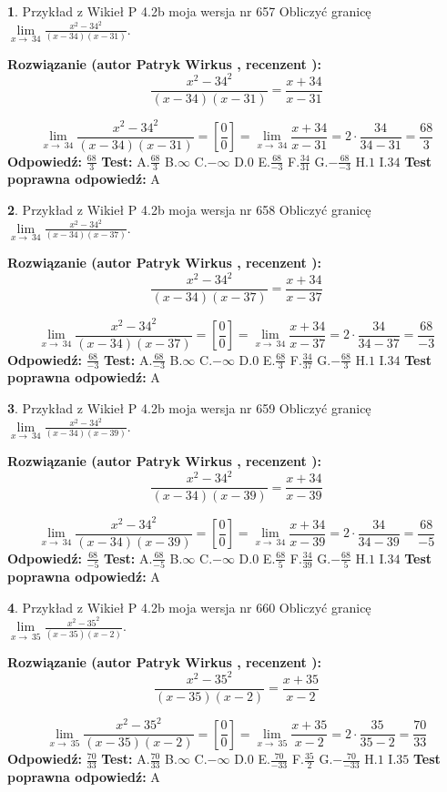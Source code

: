 \documentclass[12pt, a4paper]{article}
\theoremstyle{definition} %
\newtheorem{zad}{}
\newcommand{\zadStart}[1]{\begin{zad}#1\newline}
\newcommand{\zadStop}{\end{zad}}
\newcommand{\rozwStart}[2]{\noindent \textbf{Rozwiązanie (autor #1 , recenzent #2): }\newline}
\newcommand{\rozwStop}{\newline}
\newcommand{\odpStart}{\noindent \textbf{Odpowiedź:}\newline}
\newcommand{\odpStop}{\newline}
\newcommand{\testStart}{\noindent \textbf{Test:}\newline}
\newcommand{\testStop}{\newline}
\newcommand{\kluczStart}{\noindent \textbf{Test poprawna odpowiedź:}\newline}
\newcommand{\kluczStop}{\newline}
\begin{document}
\zadStart{Przykład z Wikieł P 4.2b moja wersja nr 657}
Obliczyć granicę $\lim\limits_{x\to\ 34}\frac{x^{2}-34^{2}}{(x-34)(x-31)}$.
\zadStop
\rozwStart{Patryk Wirkus}{}
$$\frac{x^{2}-34^{2}}{(x-34)(x-31)}=\frac{x+34}{x-31}$$

$$\lim\limits_{x\to\ 34}\frac{x^{2}-34^{2}}{(x-34)(x-31)}=[\frac{0}{0}]=\lim\limits_{x\to\ 34}\frac{x+34}{x-31}=2 \cdot \frac{34}{34-31} = \frac{68}{3}$$
\rozwStop
\odpStart
$\frac{68}{3}$
\odpStop
\testStart
A.$\frac{68}{3}$
B.$\infty$
C.$-\infty$
D.$0$
E.$\frac{68}{-3}$
F.$\frac{34}{31}$
G.$-\frac{68}{-3}$
H.$1$
I.$34$
\testStop
\kluczStart
A
\kluczStop



\zadStart{Przykład z Wikieł P 4.2b moja wersja nr 658}
Obliczyć granicę $\lim\limits_{x\to\ 34}\frac{x^{2}-34^{2}}{(x-34)(x-37)}$.
\zadStop
\rozwStart{Patryk Wirkus}{}
$$\frac{x^{2}-34^{2}}{(x-34)(x-37)}=\frac{x+34}{x-37}$$

$$\lim\limits_{x\to\ 34}\frac{x^{2}-34^{2}}{(x-34)(x-37)}=[\frac{0}{0}]=\lim\limits_{x\to\ 34}\frac{x+34}{x-37}=2 \cdot \frac{34}{34-37} = \frac{68}{-3}$$
\rozwStop
\odpStart
$\frac{68}{-3}$
\odpStop
\testStart
A.$\frac{68}{-3}$
B.$\infty$
C.$-\infty$
D.$0$
E.$\frac{68}{3}$
F.$\frac{34}{37}$
G.$-\frac{68}{3}$
H.$1$
I.$34$
\testStop
\kluczStart
A
\kluczStop



\zadStart{Przykład z Wikieł P 4.2b moja wersja nr 659}
Obliczyć granicę $\lim\limits_{x\to\ 34}\frac{x^{2}-34^{2}}{(x-34)(x-39)}$.
\zadStop
\rozwStart{Patryk Wirkus}{}
$$\frac{x^{2}-34^{2}}{(x-34)(x-39)}=\frac{x+34}{x-39}$$

$$\lim\limits_{x\to\ 34}\frac{x^{2}-34^{2}}{(x-34)(x-39)}=[\frac{0}{0}]=\lim\limits_{x\to\ 34}\frac{x+34}{x-39}=2 \cdot \frac{34}{34-39} = \frac{68}{-5}$$
\rozwStop
\odpStart
$\frac{68}{-5}$
\odpStop
\testStart
A.$\frac{68}{-5}$
B.$\infty$
C.$-\infty$
D.$0$
E.$\frac{68}{5}$
F.$\frac{34}{39}$
G.$-\frac{68}{5}$
H.$1$
I.$34$
\testStop
\kluczStart
A
\kluczStop



\zadStart{Przykład z Wikieł P 4.2b moja wersja nr 660}
Obliczyć granicę $\lim\limits_{x\to\ 35}\frac{x^{2}-35^{2}}{(x-35)(x-2)}$.
\zadStop
\rozwStart{Patryk Wirkus}{}
$$\frac{x^{2}-35^{2}}{(x-35)(x-2)}=\frac{x+35}{x-2}$$

$$\lim\limits_{x\to\ 35}\frac{x^{2}-35^{2}}{(x-35)(x-2)}=[\frac{0}{0}]=\lim\limits_{x\to\ 35}\frac{x+35}{x-2}=2 \cdot \frac{35}{35-2} = \frac{70}{33}$$
\rozwStop
\odpStart
$\frac{70}{33}$
\odpStop
\testStart
A.$\frac{70}{33}$
B.$\infty$
C.$-\infty$
D.$0$
E.$\frac{70}{-33}$
F.$\frac{35}{2}$
G.$-\frac{70}{-33}$
H.$1$
I.$35$
\testStop
\kluczStart
A
\kluczStop
\end{document}
